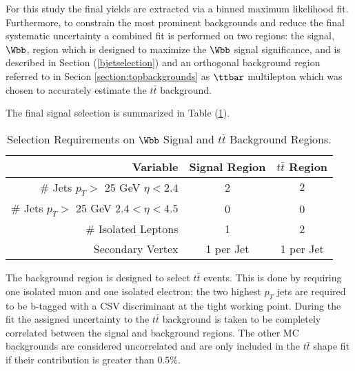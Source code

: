 
For this study the final yields are extracted via a binned maximum likelihood fit.
Furthermore, to constrain the most prominent backgrounds and reduce the final
systematic uncertainty a combined fit is performed on 
two regions: the signal, $\Wbb$, region which is designed to maximize the $\Wbb$ signal
significance, and is described in Section (\ref{bjetselection}) and an orthogonal background region
referred to in Secion \ref{section:topbackgrounds} as $\ttbar$ multilepton
which was chosen to accurately estimate the $t\bar{t}$ background.

The final signal selection is summarized in Table (\ref{tab:FitRegions}).

\begin{table}[htb]
\center
\begin{tabular}{r|c|c}
\hline
Variable&Signal Region &$t\bar{t}$ Region\\
  \hline
  \hline
  \# Jets $p_{T}>$ 25 GeV $\eta<2.4$&2&$2$\\
  \# Jets $p_{T}>$ 25 GeV $2.4<\eta<4.5$&0&0\\
  \# Isolated Leptons&1&2\\
  Secondary Vertex& 1 per Jet&1 per Jet\\
\hline
\hline
\end{tabular}
\caption{Selection Requirements on $\Wbb $ Signal and $t\bar{t}$ Background Regions.}
\label{tab:FitRegions}
\end{table}


The background region is designed to select $t\bar{t}$ events. This is done
by requiring one isolated muon and one isolated electron;
the two highest $p_{T}$ jets are required to be b-tagged with a CSV discriminant 
at the tight working point.
During the fit the assigned uncertainty to the $t\bar{t}$ background is taken to be completely correlated between the signal and background regions. The 
other MC backgrounds are considered uncorrelated and are only included in the 
$t\bar{t}$ shape fit if their contribution is greater than $0.5\%$.

